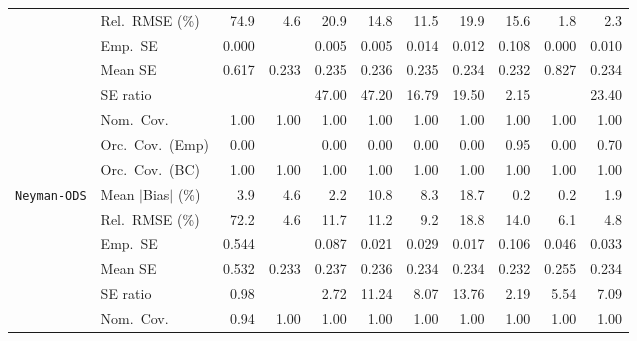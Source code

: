 \begin{landscape}
\begin{longtable}{llrrrrrrrrr}
 & Rel.\ RMSE (\%) & 74.9 & \cellcolor{rankthree}4.6 & 20.9 & 14.8 & 11.5 & 19.9 & 15.6 & \cellcolor{rankone}1.8 & \cellcolor{ranktwo}2.3 \\
 & Emp.\ SE & 0.000 &  & 0.005 & 0.005 & 0.014 & 0.012 & 0.108 & 0.000 & 0.010 \\
 & Mean SE & 0.617 & 0.233 & 0.235 & 0.236 & 0.235 & 0.234 & 0.232 & 0.827 & 0.234 \\
 & SE ratio &  &  & 47.00 & 47.20 & \cellcolor{ranktwo}16.79 & \cellcolor{rankthree}19.50 & \cellcolor{rankone}2.15 &  & 23.40 \\
 & Nom.\ Cov. & \cellcolor{rankone}1.00 & \cellcolor{rankone}1.00 & \cellcolor{rankone}1.00 & \cellcolor{rankone}1.00 & \cellcolor{rankone}1.00 & \cellcolor{rankone}1.00 & \cellcolor{rankone}1.00 & \cellcolor{rankone}1.00 & \cellcolor{rankone}1.00 \\
 & Orc.\ Cov.\ (Emp) & \cellcolor{rankthree}0.00 &  & \cellcolor{rankthree}0.00 & \cellcolor{rankthree}0.00 & \cellcolor{rankthree}0.00 & \cellcolor{rankthree}0.00 & \cellcolor{rankone}0.95 & \cellcolor{rankthree}0.00 & \cellcolor{ranktwo}0.70 \\
 & Orc.\ Cov.\ (BC) & \cellcolor{rankone}1.00 & \cellcolor{rankone}1.00 & \cellcolor{rankone}1.00 & \cellcolor{rankone}1.00 & \cellcolor{rankone}1.00 & \cellcolor{rankone}1.00 & \cellcolor{rankone}1.00 & \cellcolor{rankone}1.00 & \cellcolor{rankone}1.00 \\
\addlinespace[2pt]
\quad \texttt{Neyman-ODS} & Mean $|$Bias$|$ (\%) & 3.9 & 4.6 & \cellcolor{rankthree}2.2 & 10.8 & 8.3 & 18.7 & \cellcolor{rankone}0.2 & \cellcolor{rankone}0.2 & \cellcolor{ranktwo}1.9 \\
 & Rel.\ RMSE (\%) & 72.2 & \cellcolor{rankone}4.6 & 11.7 & 11.2 & 9.2 & 18.8 & 14.0 & \cellcolor{rankthree}6.1 & \cellcolor{ranktwo}4.8 \\
 & Emp.\ SE & 0.544 &  & 0.087 & 0.021 & 0.029 & 0.017 & 0.106 & 0.046 & 0.033 \\
 & Mean SE & 0.532 & 0.233 & 0.237 & 0.236 & 0.234 & 0.234 & 0.232 & 0.255 & 0.234 \\
 & SE ratio & \cellcolor{rankone}0.98 &  & \cellcolor{rankthree}2.72 & 11.24 & 8.07 & 13.76 & \cellcolor{ranktwo}2.19 & 5.54 & 7.09 \\
 & Nom.\ Cov. & \cellcolor{rankone}0.94 & \cellcolor{ranktwo}1.00 & \cellcolor{ranktwo}1.00 & \cellcolor{ranktwo}1.00 & \cellcolor{ranktwo}1.00 & \cellcolor{ranktwo}1.00 & \cellcolor{ranktwo}1.00 & \cellcolor{ranktwo}1.00 & \cellcolor{ranktwo}1.00 \\

\end{longtable}
\end{landscape}
